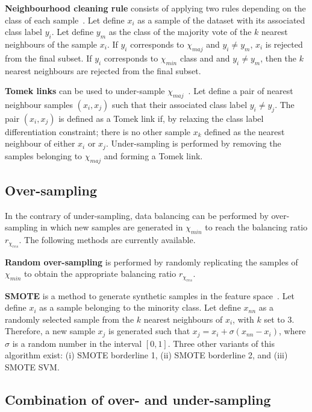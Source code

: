 \documentclass[twoside,11pt]{article}
\begin{document}
\textbf{Neighbourhood cleaning rule} consists of applying two rules depending on the class of each sample~\citep{laurikkala2001improving}.
Let define $x_i$ as a sample of the dataset with its associated class label $y_i$.
Let define $y_m$ as the class of the majority vote of the $k$ nearest neighbours of the sample $x_i$.
If $y_i$ corresponds to $\chi_{maj}$ and $y_i \neq y_m$, $x_i$ is rejected from the final subset.
If $y_i$ corresponds to $\chi_{min}$ class and and $y_i \neq y_m$, then the $k$ nearest neighbours are rejected from the final subset.

\textbf{Tomek links} can be used to under-sample $\chi_{maj}$~\citep{tomek1976two}.
Let define a pair of nearest neighbour samples $(x_i, x_j)$ such that their associated class label $y_i \neq y_j$.
The pair $(x_i, x_j)$ is defined as a Tomek link if, by relaxing the class label differentiation constraint; there is no other sample $x_k$ defined as the nearest neighbour of either $x_i$ or $x_j$.
Under-sampling is performed by removing the samples belonging to $\chi_{maj}$ and forming a Tomek link.

\subsection{Over-sampling}

In the contrary of under-sampling, data balancing can be performed by over-sampling in which new samples are generated in $\chi_{min}$ to reach the balancing ratio $r_{\chi_{res}}$.
The following methods are currently available.

\textbf{Random over-sampling} is performed by randomly replicating the samples of $\chi_{min}$ to obtain the appropriate balancing ratio $r_{\chi_{res}}$.

\textbf{SMOTE} is a method to generate synthetic samples in the feature space~\citep{chawla2002smote}.
Let define $x_i$ as a sample belonging to the minority class.
Let define $x_{nn}$ as a randomly selected sample from the $k$ nearest neighbours of $x_i$, with $k$ set to 3.
Therefore, a new sample $x_j$ is generated such that $x_j = x_i + \sigma \left( x_{nn} - x_i \right)$, where $\sigma$ is a random number in the interval $\left[0,1\right]$.
Three other variants of this algorithm exist: (i) SMOTE borderline 1, (ii) SMOTE borderline 2, and (iii) SMOTE SVM.

\subsection{Combination of over- and under-sampling}
\end{document}
